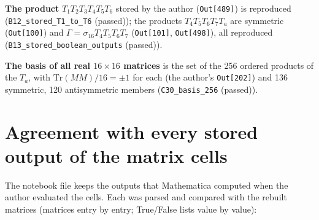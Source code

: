 \documentclass[
  10pt,
]{article}
\begin{document}
\textbf{The product} \(T_1T_2T_3T_4T_5T_6\) stored by the author
(\texttt{Out{[}489{]}}) is reproduced (\texttt{B12\_stored\_T1\_to\_T6}
(passed)); the products \(T_4T_5T_6T_7T_a\) are symmetric
(\texttt{Out{[}100{]}}) and \(\Gamma = \sigma_{16}T_4T_5T_6T_7\)
(\texttt{Out{[}101{]}}, \texttt{Out{[}498{]}}), all reproduced
(\texttt{B13\_stored\_boolean\_outputs} (passed)).

\textbf{The basis of all real \(16 \times 16\) matrices} is the set of
the 256 ordered products of the \(T_a\), with
\(\mathrm{Tr}(MM)/16 = \pm1\) for each (the author's
\texttt{Out{[}202{]}}) and 136 symmetric, 120 antisymmetric members
(\texttt{C30\_basis\_256} (passed)).

\hypertarget{agreement-with-every-stored-output-of-the-matrix-cells}{%
\section{Agreement with every stored output of the matrix
cells}\label{agreement-with-every-stored-output-of-the-matrix-cells}}

The notebook file keeps the outputs that Mathematica computed when the
author evaluated the cells. Each was parsed and compared with the
rebuilt matrices (matrices entry by entry; True/False lists value by
value):
\end{document}
